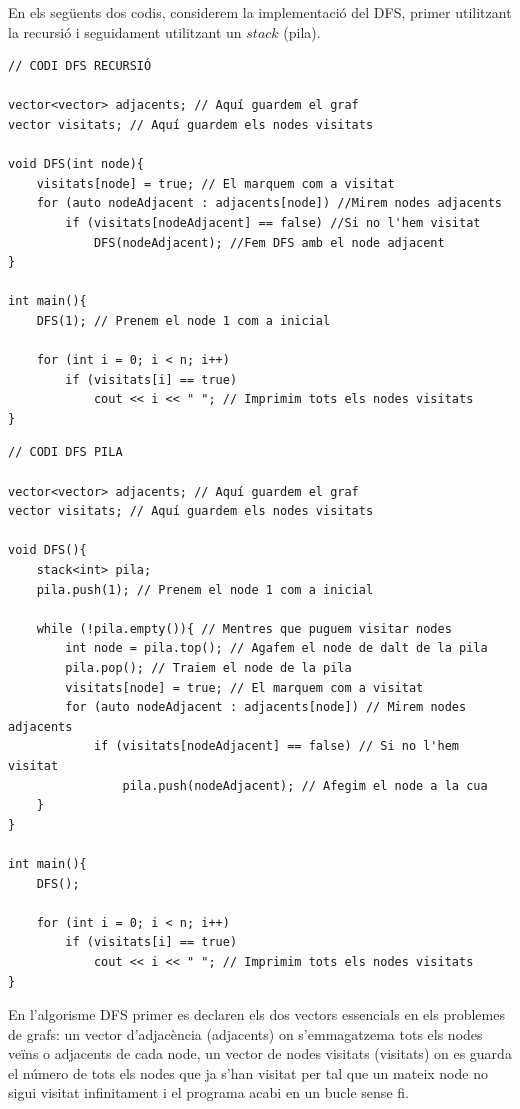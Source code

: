 En els següents dos codis, considerem la implementació del DFS, primer utilitzant la recursió i seguidament utilitzant un $stack$ (pila).

\newpage

\begin{lstlisting}
// CODI DFS RECURSIÓ

vector<vector> adjacents; // Aquí guardem el graf
vector visitats; // Aquí guardem els nodes visitats

void DFS(int node){
    visitats[node] = true; // El marquem com a visitat
    for (auto nodeAdjacent : adjacents[node]) //Mirem nodes adjacents
        if (visitats[nodeAdjacent] == false) //Si no l'hem visitat
            DFS(nodeAdjacent); //Fem DFS amb el node adjacent
}

int main(){
    DFS(1); // Prenem el node 1 com a inicial
    
    for (int i = 0; i < n; i++)
        if (visitats[i] == true)
            cout << i << " "; // Imprimim tots els nodes visitats
}
\end{lstlisting}

\begin{lstlisting}
// CODI DFS PILA

vector<vector> adjacents; // Aquí guardem el graf
vector visitats; // Aquí guardem els nodes visitats

void DFS(){
    stack<int> pila;
    pila.push(1); // Prenem el node 1 com a inicial
    
    while (!pila.empty()){ // Mentres que puguem visitar nodes
        int node = pila.top(); // Agafem el node de dalt de la pila
        pila.pop(); // Traiem el node de la pila
        visitats[node] = true; // El marquem com a visitat
        for (auto nodeAdjacent : adjacents[node]) // Mirem nodes adjacents
            if (visitats[nodeAdjacent] == false) // Si no l'hem visitat
                pila.push(nodeAdjacent); // Afegim el node a la cua
    }
}

int main(){
    DFS();
    
    for (int i = 0; i < n; i++)
        if (visitats[i] == true)
            cout << i << " "; // Imprimim tots els nodes visitats
}

\end{lstlisting}
\newpage

En l'algorisme DFS primer es declaren els dos vectors essencials en els problemes de grafs: un vector d'adjacència (adjacents) on s'emmagatzema tots els nodes veïns o adjacents de cada node, un vector de nodes visitats (visitats) on es guarda el número de tots els nodes que ja s'han visitat per tal que un mateix node no sigui visitat infinitament i el programa acabi en un bucle sense fi.

